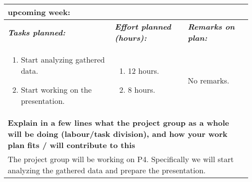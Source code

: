 \documentclass[a4paper]{article}
\begin{document}
\begin{center}
\begin{tabular}{ | p{6cm} | p{6cm} | p{6cm} | p{6cm} | }
{{    upcoming week:}} \\
    \hline
    \textbf{\textit{Tasks planned:}} &
    \textbf{\textit{Effort planned (hours):}} &
    \multicolumn{2}{|p{12cm}|}{\textbf{\textit{Remarks on plan:}}} \\
    \begin{enumerate}
      \vspace{-6mm}
      \item Start analyzing gathered data.
      \item Start working on the presentation.
    \end{enumerate} &
    \begin{enumerate}
      \item 12 hours.
      \item 8 hours.
    \end{enumerate} &
    \multicolumn{2}{|p{12cm}|}{No remarks.} \\
    \hline
    \multicolumn{4}{|p{24cm}|}{\textbf{Explain in a few lines what the project
    group as a whole will be doing (labour/task division), and how your work
    plan fits / will contribute to this}} \\
    \multicolumn{4}{|p{24cm}|}{The project group will be working on P4.
    Specifically we will start analyzing the gathered data and prepare the
    presentation.} \\
    \hline
  \end{tabular}
  \egroup
\end{center}
\end{document}
